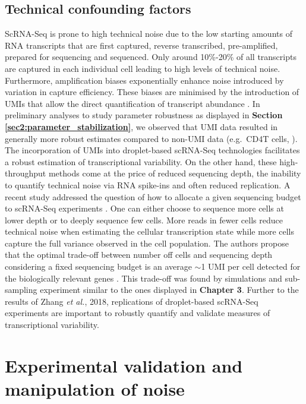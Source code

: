 \subsection{Technical confounding factors}

ScRNA-Seq is prone to high technical noise due to the low starting amounts of RNA transcripts that are first captured, reverse transcribed, pre-amplified, prepared for sequencing and sequenced. 
Only around 10\%-20\% of all transcripts are captured in each individual cell leading to high levels of technical noise. 
Furthermore, amplification biases exponentially enhance noise introduced by variation in capture efficiency. 
These biases are minimised by the introduction of \glspl{UMI} that allow the direct quantification of transcript abundance \cite{Islam2014}. 
In preliminary analyses to study parameter robustness as displayed in \textbf{Section \ref{sec2:parameter_stabilization}}, we observed that UMI data \citep{Zeisel2015} resulted in generally more robust estimates compared to non-UMI data (e.g.~CD4\plus T cells, \citep{Martinez-jimenez2017}).\\

The incorporation of UMIs into droplet-based scRNA-Seq technologies facilitates a robust estimation of transcriptional variability. 
On the other hand, these high-throughput methods come at the price of reduced sequencing depth, the inability to quantify technical noise via RNA spike-ins and often reduced replication. 
A recent study addressed the question of how to allocate a given sequencing budget to scRNA-Seq experiments \citep{Zhang2018}. 
One can either choose to sequence more cells at lower depth or to  deeply sequence few cells. 
More reads in fewer cells reduce technical noise when estimating the cellular transcription state while more cells capture the full variance observed in the cell population. 
The authors propose that the optimal trade-off between number off cells and sequencing depth considering a fixed sequencing budget is an average $\sim$1 UMI per cell detected for the biologically relevant genes \citep{Zhang2018}. 
This trade-off was found by simulations and sub-sampling experiment similar to the ones displayed in \textbf{Chapter 3}. 
Further to the results of Zhang \emph{et al.}, 2018, replications of droplet-based scRNA-Seq experiments are important to robustly quantify and validate measures of transcriptional variability. 

\section{Experimental validation and manipulation of noise}

